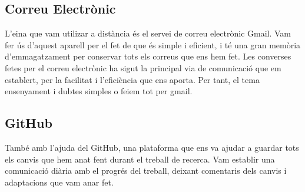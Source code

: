 \subsection{Correu Electrònic}
L'eina que vam utilizar a distància és el servei de correu electrònic Gmail. Vam fer ús d'aquest aparell per el fet de que és simple i eficient, i té una gran memòria d'emmagatzament per conservar tots els correus que ens hem fet.
Les converses fetes per el correu electrònic ha sigut la principal via de comunicació que em establert, per la facilitat i l'eficiència que ens aporta. Per tant, el tema ensenyament i dubtes simples o feiem tot per gmail.

\subsection{GitHub}
També amb l'ajuda del GitHub, una plataforma que ens va ajudar a guardar tots els canvis que hem anat fent durant el treball de recerca. Vam  establir una comunicació diària amb el progrés del treball, deixant comentaris dels canvis i adaptacions que vam anar fet.


